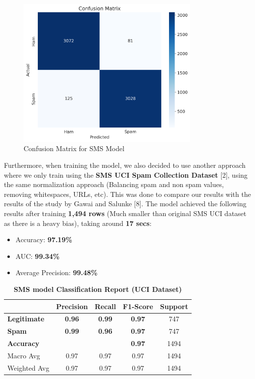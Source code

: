 \documentclass{article}
\begin{document}
\begin{figure}[htbp]
    \centering
    \includegraphics[width=0.8\textwidth]{../analysis/sms/randomforest/confusion_matrix.png}
    \caption{Confusion Matrix for SMS Model}
    \label{fig:confusion_matrix_2}
\end{figure}

\newpage

\noindent
Furthermore, when training the model, we also decided to use another approach where we only train using the \textbf{SMS UCI Spam Collection Dataset} [2], using the same normalization approach (Balancing spam and non spam values, removing whitespaces, URLs, etc). This was done to compare our results with the results of the study by Gawai and Salunke [8]. The model achieved the following results after training \textbf{1,494 rows} (Much smaller than original SMS UCI dataset as there is a heavy bias), taking around \textbf{17 secs}: 

\begin{itemize}
    \item Accuracy: \textbf{97.19\%}
    \item AUC: \textbf{99.34\%}
    \item Average Precision: \textbf{99.48\%}
\end{itemize}

\begin{table}[htbp]
    \centering
    \caption{\textbf{SMS model Classification Report (UCI Dataset)}}
    \begin{tabular}{l c c c c}
    \toprule
     & \textbf{Precision} & \textbf{Recall} & \textbf{F1-Score} & Support \\
    \midrule
    \textbf{Legitimate} & \textbf{0.96} & \textbf{0.99} & \textbf{0.97} & 747 \\
    \textbf{Spam} & \textbf{0.99} & \textbf{0.96} & \textbf{0.97} & 747 \\
    \midrule
    \textbf{Accuracy} & & & \textbf{0.97} & 1494 \\
    Macro Avg & 0.97 & 0.97 & 0.97 & 1494 \\
    Weighted Avg & 0.97 & 0.97 & 0.97 & 1494 \\
    \bottomrule
    \end{tabular}
    \label{tab:classification_report_3}
\end{table}
\end{document}
